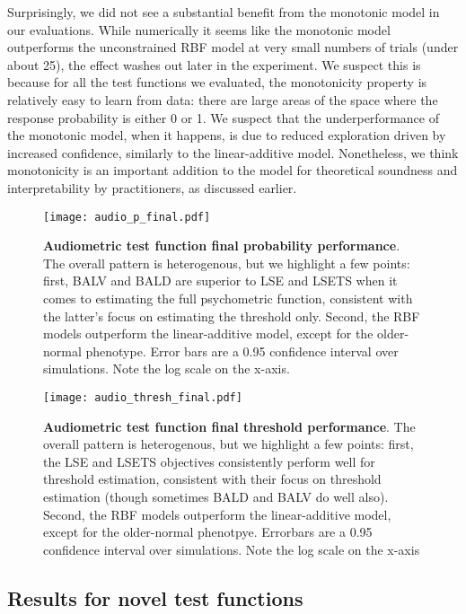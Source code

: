 \documentclass[../main.tex]{subfiles}
\begin{document}
Surprisingly, we did not see a substantial benefit from the monotonic model in our evaluations. While numerically it seems like the monotonic model outperforms the unconstrained RBF model at very small numbers of trials (under about 25), the effect washes out later in the experiment. We suspect this is because for all the test functions we evaluated, the monotonicity property is relatively easy to learn from data: there are large areas of the space where the response probability is either 0 or 1. We suspect that the underperformance of the monotonic model, when it happens, is due to reduced exploration driven by increased confidence, similarly to the linear-additive model. Nonetheless, we think monotonicity is an important addition to the model for theoretical soundness and interpretability by practitioners, as discussed earlier.

\begin{figure*}[!htb]
    \centering
    \texttt{[image: audio\_p\_final.pdf]}
    \caption{\textbf{Audiometric test function final probability performance}. The overall pattern is heterogenous, but we highlight a few points: first, BALV and BALD are superior to LSE and LSETS when it comes to estimating the full psychometric function, consistent with the latter's focus on estimating the threshold only. Second, the RBF models outperform the linear-additive model, except for the older-normal phenotype. Error bars are a 0.95 confidence interval over simulations. Note the log scale on the x-axis. }
    \label{fig:song-p}
\end{figure*}

\begin{figure*}[!htb]
    \centering
    \texttt{[image: audio\_thresh\_final.pdf]}
    \caption{\textbf{Audiometric test function final threshold performance}. The overall pattern is heterogenous, but we highlight a few points: first, the LSE and LSETS objectives consistently perform well for threshold estimation, consistent with their focus on threshold estimation (though sometimes BALD and BALV do well also). Second, the RBF models outperform the linear-additive model, except for the older-normal phenotpye. Errorbars are a 0.95 confidence interval over simulations. Note the log scale on the x-axis}
    \label{fig:song-thresh}
\end{figure*}

\subsection{Results for novel test functions}
\end{document}
